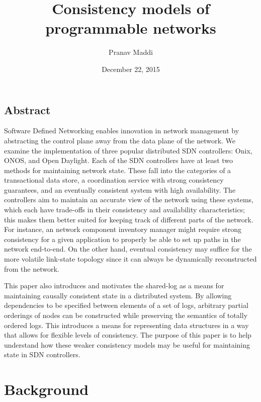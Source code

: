 \documentclass[letterpaper,twocolumn,10pt]{article}
\begin{document}
\title{\Large Consistency models of programmable networks}

\author{Pranav Maddi}

\date{December 22, 2015}
\maketitle

\tableofcontents

\subsection*{Abstract}

Software Defined Networking enables innovation in network management by abstracting the control plane away from the data plane of the network. We examine the implementation of three popular distributed SDN controllers: Onix, ONOS, and Open Daylight. Each of the SDN controllers have at least two methods for maintaining network state. These fall into the categories of a transactional data store, a coordination service with strong consistency guarantees, and an eventually consistent system with high availability. The controllers aim to maintain an accurate view of the network using these systems, which each have trade-offs in their consistency and availability characteristics; this makes them better suited for keeping track of different parts of the network. For instance, an network component inventory manager might require strong consistency for a given application to properly be able to set up paths in the network end-to-end. On the other hand, eventual consistency may suffice for the more volatile link-state topology since it can always be dynamically reconstructed from the network.

This paper also introduces and motivates the shared-log as a means for maintaining causally consistent state in a distributed system. By allowing dependencies to be specified between elements of a set of logs, arbitrary partial orderings of nodes can be constructed while preserving the semantics of totally ordered logs. This introduces a means for representing data structures in a way that allows for flexible levels of consistency. The purpose of this paper is to help understand how these weaker consistency models may be useful for maintaining state in SDN controllers. 

\section{Background}
\end{document}
